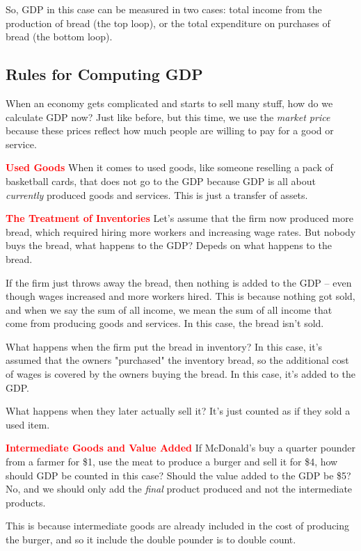 \documentclass[12pt]{article}
\newcommand{\leadwords}[2]{\textcolor{red}{\textbf{\large #1}} #2}
\begin{document}
So, GDP in this case can be measured in two cases: total income from the production of bread (the top loop), or the total expenditure on purchases of bread (the bottom loop).


\subsection{Rules for Computing GDP}


When an economy gets complicated and starts to sell many stuff, how do we calculate GDP now? Just like before, but this time, we use the \textit{market price} because these prices reflect how much people are willing to pay for a good or service.



\leadwords{Used Goods} When it comes to used goods, like someone reselling a pack of basketball cards, that does not go to the GDP because GDP is all about \textit{currently} produced goods and services. This is just a transfer of assets.


\leadwords{The Treatment of Inventories} Let's assume that the firm now produced more bread, which required hiring more workers and increasing wage rates. But nobody buys the bread, what happens to the GDP? Depeds on what happens to the bread.

If the firm just throws away the bread, then nothing is added to the GDP -- even though wages increased and more workers hired. This is because nothing got sold, and when we say the sum of all income, we mean the sum of all income that come from producing goods and services. In this case, the bread isn't sold.

What happens when the firm put the bread in inventory? In this case, it's assumed that the owners "purchased" the inventory bread, so the additional cost of wages is covered by the owners buying the bread. In this case, it's added to the GDP.

What happens when they later actually sell it? It's just counted as if they sold a used item.

\leadwords{Intermediate Goods and Value Added} If McDonald's buy a quarter pounder from a farmer for \$1, use the meat to produce a burger and sell it for \$4, how should GDP be counted in this case? Should the value added to the GDP be \$5? No, and we should only add the \textit{final} product produced and not the intermediate products.

This is because intermediate goods are already included in the cost of producing the burger, and so it include the double pounder is to double count.
\end{document}
